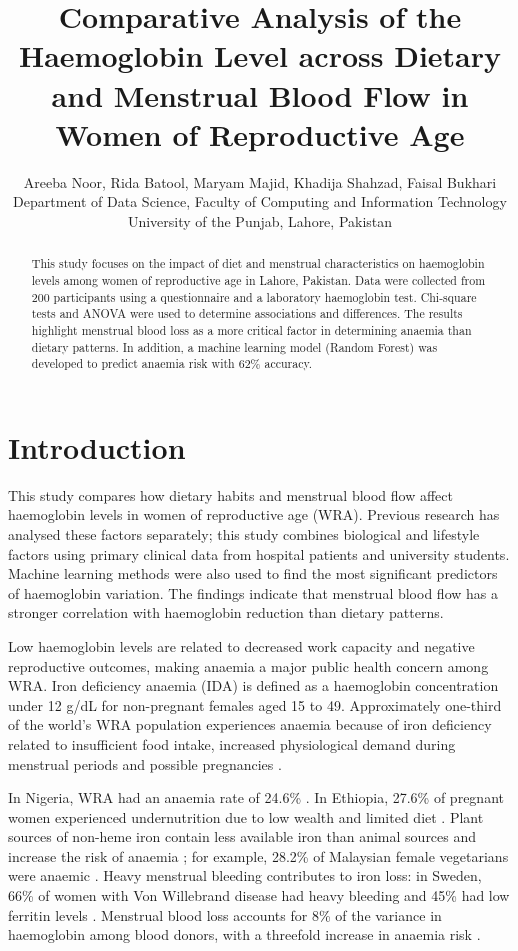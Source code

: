 \documentclass{article}
\title{Comparative Analysis of the Haemoglobin Level across Dietary and Menstrual Blood Flow in Women of Reproductive Age}
\author{Areeba Noor, Rida Batool, Maryam Majid, Khadija Shahzad, Faisal Bukhari \\ Department of Data Science, Faculty of Computing and Information Technology \\ University of the Punjab, Lahore, Pakistan}
\date{}
\begin{document}
\maketitle

\begin{abstract}
This study focuses on the impact of diet and menstrual characteristics on haemoglobin levels among women of reproductive age in Lahore, Pakistan. Data were collected from 200 participants using a questionnaire and a laboratory haemoglobin test. Chi-square tests and ANOVA were used to determine associations and differences. The results highlight menstrual blood loss as a more critical factor in determining anaemia than dietary patterns. In addition, a machine learning model (Random Forest) was developed to predict anaemia risk with 62\% accuracy.
\end{abstract}

\section{Introduction}
This study compares how dietary habits and menstrual blood flow affect haemoglobin levels in women of reproductive age (WRA). Previous research has analysed these factors separately; this study combines biological and lifestyle factors using primary clinical data from hospital patients and university students. Machine learning methods were also used to find the most significant predictors of haemoglobin variation. The findings indicate that menstrual blood flow has a stronger correlation with haemoglobin reduction than dietary patterns.

Low haemoglobin levels are related to decreased work capacity and negative reproductive outcomes, making anaemia a major public health concern among WRA. Iron deficiency anaemia (IDA) is defined as a haemoglobin concentration under 12 g/dL for non-pregnant females aged 15 to 49. Approximately one-third of the world's WRA population experiences anaemia because of iron deficiency related to insufficient food intake, increased physiological demand during menstrual periods and possible pregnancies \cite{alem}.

In Nigeria, WRA had an anaemia rate of 24.6\% \cite{mankell}. In Ethiopia, 27.6\% of pregnant women experienced undernutrition due to low wealth and limited diet \cite{alemu}. Plant sources of non-heme iron contain less available iron than animal sources and increase the risk of anaemia \cite{lopez}; for example, 28.2\% of Malaysian female vegetarians were anaemic \cite{chai}. Heavy menstrual bleeding contributes to iron loss: in Sweden, 66\% of women with Von Willebrand disease had heavy bleeding and 45\% had low ferritin levels \cite{myrin}. Menstrual blood loss accounts for 8\% of the variance in haemoglobin among blood donors, with a threefold increase in anaemia risk \cite{ekroos}.
\end{document}
